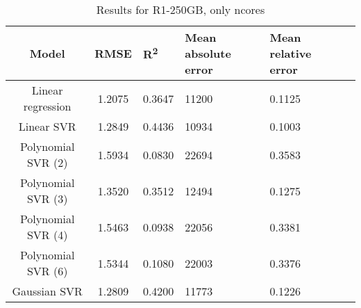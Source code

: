 \begin{table}[H]
\centering
\begin{adjustbox}{center}
\begin{tabular}{c | c M{1.2cm} M{2.5cm} M{2.5cm} M{1.8cm}}
Model & RMSE & R\textsuperscript{2} & Mean absolute error & Mean relative error \tabularnewline
\hline
Linear regression & 1.2075 & 0.3647 &  11200 & 0.1125 \\
Linear SVR & 1.2849 & 0.4436 &  10934 & 0.1003 \\
Polynomial SVR (2) & 1.5934 & 0.0830 &  22694 & 0.3583 \\
Polynomial SVR (3) & 1.3520 & 0.3512 &  12494 & 0.1275 \\
Polynomial SVR (4) & 1.5463 & 0.0938 &  22056 & 0.3381 \\
Polynomial SVR (6) & 1.5344 & 0.1080 &  22003 & 0.3376 \\
Gaussian SVR & 1.2809 & 0.4200 &  11773 & 0.1226 \\
\end{tabular}
\end{adjustbox}
\\
\caption{Results for R1-250GB, only ncores}
\label{tab:only_1_linear_R1_250}
\end{table}
